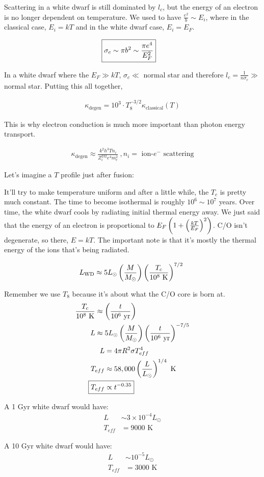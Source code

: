 Scattering in a white dwarf is still dominated by $l_c$, but the energy of an electron is no longer dependent on temperature. We used to have $\frac{e^2}{b} \sim E_i$, where in the classical case, $E_i = kT$ and in the white dwarf case, $E_i = E_F$. 

\begin{align}
\Aboxed{\sigma_c &\sim \pi b^2 \sim \frac{ \pi e^4}{E_F^2}}
\end{align}

In a white dwarf where the $E_F \gg kT$, $\sigma_c \ll $ normal star and therefore $l_c = \frac{1}{n\sigma_c} \gg $ normal star. Putting this all together,

\begin{align}
\kappa_{\textrm{degen}} = 10^3 \cdot T_8^{-3/2}\kappa_{\textrm{classical}}(T)
\end{align}

This is why electron conduction is much more important than photon energy transport. 

\begin{align}
\kappa_{\textrm{degen}} \approx \frac{k^2h^3Tn_i}{Z_i^232e^4m_e^2}~,n_i = \textrm{ ion-$e^-$ scattering}
\end{align}

Let's imagine a $T$ profile just after fusion: 


It'll try to make temperature uniform and after a little while, the $T_c$ is pretty much constant. The time to become isothermal is roughly $10^6 \sim 10^7$ years. Over time, the white dwarf cools by radiating initial thermal energy away. We just said that the energy of an electron is proportional to $E_F\left( 1 + \left( \frac{kT}{E_F}\right)^2 \right)$. C/O isn't degenerate, so there, $E = kT$. The important note is that it's mostly the thermal energy of the ions that's being radiated. 

\begin{align}
L_{\textrm{WD}} \approx 5L_\odot \left( \frac{M}{M_\odot}\right) \left( \frac{T_c}{10^8 \textrm{ K}} \right)^{7/2}~
\end{align}

Remember we use $T_8$ because it's about what the C/O core is born at.
\begin{align}
\frac{T_c}{10^8\textrm{ K}} &\approx \left( \frac{t}{10^6\textrm{ yr}} \right)\\
L &\approx 5 L_\odot \left( \frac{M}{M_\odot}\right) \left( \frac{t}{10^6 \textrm{ yr}} \right)^{-7/5}
\end{align}
\begin{align}
L &= 4\pi R^2 \sigma T_{eff}^4\\
T_{eff} &\approx 58,000 \lp \frac{L}{L_\odot} \rp^{1/4} \textrm{ K}\\
\Aboxed{T_{eff} &\pt t^{-0.35}}
\end{align}

A 1 Gyr white dwarf would have:
\begin{align}
L &\sim 3 \times 10^{-4} L_\odot\\
T_{eff} &= 9000\textrm{ K}
\end{align}

A 10 Gyr white dwarf would have:
\begin{align}
L &\sim 10^{-5} L_\odot\\
T_{eff} &= 3000\textrm{ K}
\end{align}

